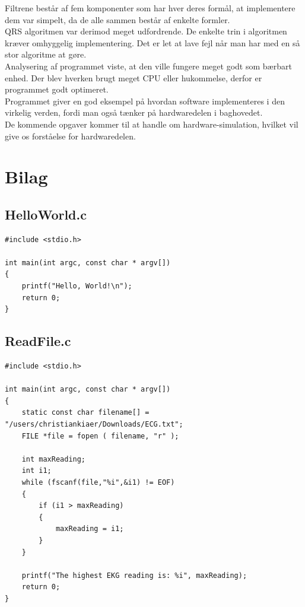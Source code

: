 \documentclass[a4paper,12pt]{article}
\begin{document}
Filtrene består af fem komponenter som har hver deres formål, at implementere dem var simpelt, da de alle sammen består af enkelte formler. \\

QRS algoritmen var derimod meget udfordrende.  De enkelte trin i algoritmen kræver omhyggelig implementering. Det er let at lave fejl når man har med en så stor algoritme at gøre. \\

Analysering af programmet viste, at den ville fungere meget godt som bærbart enhed. Der blev hverken brugt meget CPU eller hukommelse, derfor er programmet godt optimeret. \\

Programmet giver en god eksempel på hvordan software implementeres i den 
virkelig verden, fordi man også tænker på hardwaredelen i baghovedet. \\

De kommende opgaver kommer til at handle om hardware-simulation, hvilket vil give os forståelse for hardwaredelen. \\
\newpage
\section{Bilag}
\subsection{HelloWorld.c}
\begin{verbatim}
#include <stdio.h>

int main(int argc, const char * argv[])
{
    printf("Hello, World!\n");
    return 0;
}
\end{verbatim}
\subsection{ReadFile.c}
\begin{verbatim}
#include <stdio.h>

int main(int argc, const char * argv[])
{
    static const char filename[] = "/users/christiankiaer/Downloads/ECG.txt";
    FILE *file = fopen ( filename, "r" );
    
    int maxReading;
    int i1;
    while (fscanf(file,"%i",&i1) != EOF)
    {
        if (i1 > maxReading)
        {
            maxReading = i1;
        }
    }
    
    printf("The highest EKG reading is: %i", maxReading);
    return 0;
}
\end{verbatim}
\end{document}

